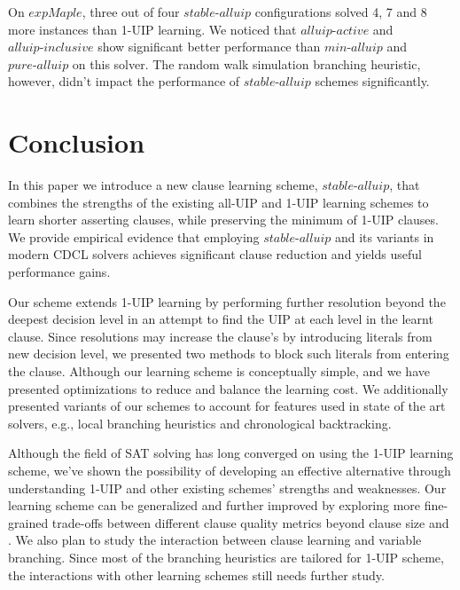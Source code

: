 \documentclass[runningheads]{llncs}
\newcommand{\oneuip}{1-UIP\xspace}
\newcommand{\alluip}{all-UIP\xspace}
\newcommand{\LBD}{\text{LBD}\xspace}
\newcommand{\stablealluip}{\textit{stable-alluip}\xspace}
\newcommand{\allUipPure}{\textit{pure-alluip}\xspace}
\newcommand{\allUipMin}{\textit{min-alluip}\xspace}
\newcommand{\allUipAct}{\textit{alluip-active}}
\newcommand{\allUipIn}{\textit{alluip-inclusive}}
\newcommand{\expSATShort}{\textit{expMaple} }
\begin{document}
On $\expSATShort$, three out of four $\stablealluip$ configurations solved
4, 7 and 8 more instances than \oneuip learning. We noticed that
$\allUipAct$ and $\allUipIn$ show significant better performance than
$\allUipMin$ and $\allUipPure$ on this solver. The random walk
simulation branching heuristic, however, didn't impact the performance
of $\stablealluip$ schemes significantly.

\section{Conclusion}
In this paper we introduce a new clause learning scheme, $\stablealluip$,
that combines the strengths of the existing \alluip and \oneuip learning
schemes to learn shorter asserting clauses, while preserving the
minimum \LBD of \oneuip clauses. We provide empirical evidence that
employing $\stablealluip$ and its variants in modern CDCL solvers achieves
significant clause reduction and yields useful performance gains.

Our scheme extends \oneuip learning by performing further resolution
beyond the deepest decision level in an attempt to find the UIP at
each level in the learnt clause. Since resolutions may increase the
clause's \LBD by introducing literals from new decision level, we
presented two methods to block such literals from entering the
clause. Although our learning scheme is conceptually simple, and we
have presented optimizations to reduce and balance the learning
cost. We additionally presented variants of our schemes to account for
features used in state of the art solvers, e.g., local branching
heuristics and chronological backtracking.

Although the field of SAT solving has long converged on using the
\oneuip learning scheme, we've shown the possibility of developing an
effective alternative through understanding \oneuip and other existing
schemes' strengths and weaknesses.  Our learning scheme can be
generalized and further improved by exploring more fine-grained
trade-offs between different clause quality metrics beyond clause size
and \LBD. We also plan to study the interaction between clause learning
and variable branching. Since most of the branching heuristics are
tailored for \oneuip scheme, the interactions with other learning
schemes still needs further study.

{}

\end{document}
